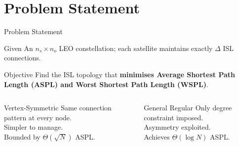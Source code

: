 \documentclass[aspectratio=169]{beamer}
\begin{document}
\section{Problem Statement}
\begin{frame}{Problem Statement}
  \vspace{0.15cm}
  \small

  \begin{block}{Given}
    An $n_s \times n_o$ LEO constellation; each satellite maintains exactly $\Delta$ ISL connections.
  \end{block}

  \vspace{0.2cm}

  \begin{block}{Objective}
    Find the ISL topology that \textbf{minimises Average Shortest Path Length (ASPL) and Worst Shortest Path Length (WSPL)}.
  \end{block}

  \vspace{0.2cm}

  \begin{columns}[T, totalwidth=\textwidth]
    \begin{block}{Vertex-Symmetric}
      Same connection pattern at every node.\\[5pt]
      Simpler to manage.\\
      Bounded by $\Theta(\sqrt{N})$ ASPL.
    \end{block}

    \begin{block}{General Regular}
      Only degree constraint imposed.\\[5pt]
      Asymmetry exploited.\\
      Achieves $\Theta(\log N)$ ASPL.
    \end{block}
  \end{columns}
\end{frame}

\end{document}
